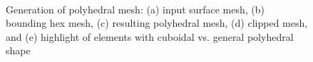 \begin{figure}
{\label{fig:cel3}}
\\		
\caption{Generation of polyhedral mesh: (a) input surface mesh, (b) bounding hex mesh,  (c) resulting polyhedral mesh, (d) clipped mesh, and (e) highlight of elements with cuboidal vs. general polyhedral shape}
\label{fig:cel}
\end{figure}

